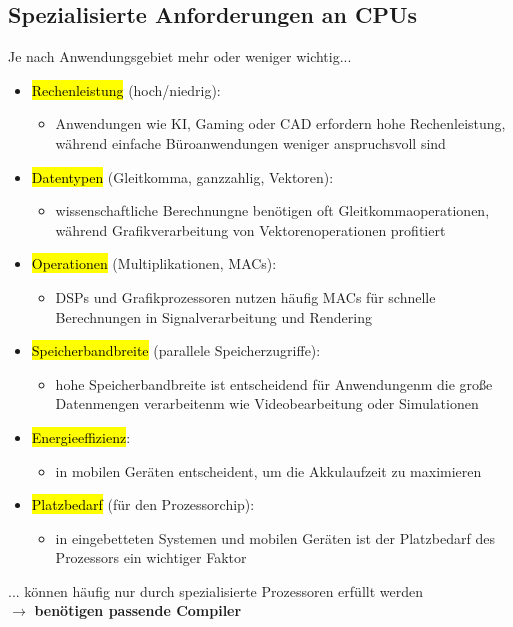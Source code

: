 \documentclass[a4paper, 10pt]{article}
\begin{document}
\subsection{Spezialisierte Anforderungen an CPUs}
Je nach Anwendungsgebiet mehr oder weniger wichtig...
\begin{itemize}
    \item \hl{Rechenleistung} (hoch/niedrig):
    \begin{itemize}
        \item Anwendungen wie KI, Gaming oder CAD erfordern hohe Rechenleistung, während einfache Büroanwendungen weniger anspruchsvoll sind
    \end{itemize}

    \item \hl{Datentypen} (Gleitkomma, ganzzahlig, Vektoren):
    \begin{itemize}
        \item wissenschaftliche Berechnungne benötigen oft Gleitkommaoperationen, während Grafikverarbeitung von Vektorenoperationen profitiert
    \end{itemize}

    \item \hl{Operationen} (Multiplikationen, MACs):
    \begin{itemize}
        \item DSPs und Grafikprozessoren nutzen häufig MACs für schnelle Berechnungen in Signalverarbeitung und Rendering
    \end{itemize}

    \item \hl{Speicherbandbreite} (parallele Speicherzugriffe):
    \begin{itemize}
        \item hohe Speicherbandbreite ist entscheidend für Anwendungenm die große Datenmengen verarbeitenm wie Videobearbeitung oder Simulationen
    \end{itemize}

    \item \hl{Energieeffizienz}:
    \begin{itemize}
        \item in mobilen Geräten entscheident, um die Akkulaufzeit zu maximieren
    \end{itemize}

    \item \hl{Platzbedarf} (für den Prozessorchip):
    \begin{itemize}
        \item in eingebetteten Systemen und mobilen Geräten ist der Platzbedarf des Prozessors ein wichtiger Faktor
    \end{itemize}
\end{itemize}
... können häufig nur durch spezialisierte Prozessoren erfüllt werden\\[3mm]
$\longrightarrow$ \textbf{benötigen passende Compiler}
\end{document}
